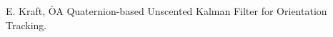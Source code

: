 \documentclass[letterpaper, 10 pt, conference]{ieeeconf}  %
\begin{document}

\begin{thebibliography}{99}

 E. Kraft, ÒA Quaternion-based Unscented Kalman Filter for Orientation Tracking.

\end{thebibliography}

\end{document}
